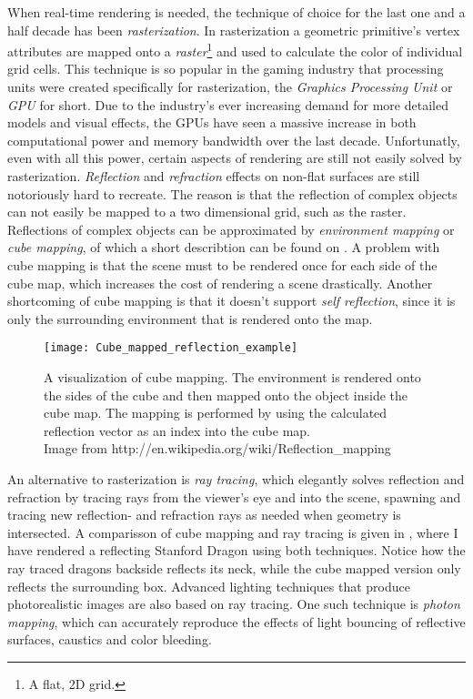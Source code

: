When real-time rendering is needed, the technique of choice for the last one and
a half decade has been \textit{rasterization}. In rasterization a geometric
primitive's vertex attributes are mapped onto a \textit{raster}\footnote{A flat,
  2D grid.} and used to calculate the color of individual grid cells. This
technique is so popular in the gaming industry that processing units were
created specifically for rasterization, the \textit{Graphics Processing Unit} or
\textit{GPU} for short. Due to the industry's ever increasing demand for more
detailed models and visual effects, the GPUs have seen a massive increase in
both computational power and memory bandwidth over the last
decade. Unfortunatly, even with all this power, certain aspects of rendering are
still not easily solved by rasterization. \textit{Reflection} and
\textit{refraction} effects on non-flat surfaces are still notoriously hard to
recreate. The reason is that the reflection of complex objects can not easily be
mapped to a two dimensional grid, such as the raster. Reflections of complex
objects can be approximated by \textit{environment mapping} or \textit{cube
  mapping}, of which a short describtion can be found on . A
problem with cube mapping is that the scene must to be rendered once for each
side of the cube map, which increases the cost of rendering a scene
drastically. Another shortcoming of cube mapping is that it doesn't support
\textit{self reflection}, since it is only the surrounding environment that is
rendered onto the map.

\begin{figure}
  \centering
  \texttt{[image: Cube\_mapped\_reflection\_example]}

  \vspace{3mm}
  \parbox{9.5cm}{\caption[Cube mapping visualized.]{A visualization of cube
      mapping. The environment is rendered onto the sides of the cube and then
      mapped onto the object inside the cube map. The mapping is performed by
      using the calculated reflection vector as an index into the cube
      map.\\Image from
      http://en.wikipedia.org/wiki/Reflection\_mapping}\label{fig:cubemap}}
\end{figure}


An alternative to rasterization is \textit{ray tracing}, which elegantly solves
reflection and refraction by tracing rays from the viewer's eye and into the
scene, spawning and tracing new reflection- and refraction rays as needed when
geometry is intersected. A comparisson of cube mapping and ray tracing is given
in , where I have rendered a reflecting Stanford
Dragon using both techniques. Notice how the ray traced dragons backside
reflects its neck, while the cube mapped version only reflects the surrounding
box. Advanced lighting techniques that produce photorealistic images are also
based on ray tracing. One such technique is \textit{photon mapping}, which can
accurately reproduce the effects of light bouncing of reflective surfaces,
caustics and color bleeding.

